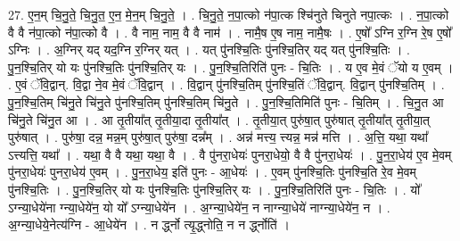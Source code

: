 \documentclass[17pt]{extarticle}
\begin{document}
27. ए॒न॒म् चि॒नु॒ते॒ चि॒नु॒त॒ ए॒न॒ मे॒न॒म् चि॒नु॒ते॒ । . चि॒नु॒ते॒ न॒पा॒त्को न॑पा॒त्क श्चि॑नुते चिनुते नपा॒त्कः । . न॒पा॒त्को वै वै न॑पा॒त्को न॑पा॒त्को वै । . वै नाम॒ नाम॒ वै वै नाम॑ । . नामै॒ष ए॒ष नाम॒ नामै॒षः । . ए॒षो᳚ ऽग्नि र॒ग्नि रे॒ष ए॒षो᳚ ऽग्निः । . अ॒ग्निर् यद् यद॒ग्नि र॒ग्निर् यत् । . यत् पु॑नश्चि॒तिः पु॑नश्चि॒तिर् यद् यत् पु॑नश्चि॒तिः । . पु॒न॒श्चि॒तिर् यो यः पु॑नश्चि॒तिः पु॑नश्चि॒तिर् यः । . पु॒न॒श्चि॒तिरिति॑ पुनः - चि॒तिः । . य ए॒व मे॒वं ॅयो य ए॒वम् । . ए॒वं ॅवि॒द्वान्. वि॒द्वा ने॒व मे॒वं ॅवि॒द्वान् । . वि॒द्वान् पु॑नश्चि॒तिम् पु॑नश्चि॒तिं ॅवि॒द्वान्. वि॒द्वान् पु॑नश्चि॒तिम् । . पु॒न॒श्चि॒तिम् चि॑नु॒ते चि॑नु॒ते पु॑नश्चि॒तिम् पु॑नश्चि॒तिम् चि॑नु॒ते । . पु॒न॒श्चि॒तिमिति॑ पुनः - चि॒तिम् । . चि॒नु॒त आ चि॑नु॒ते चि॑नु॒त आ । . आ तृ॒तीया᳚त् तृ॒तीया॒दा तृ॒तीया᳚त् । . तृ॒तीया॒त् पुरु॑षा॒त् पुरु॑षात् तृ॒तीया᳚त् तृ॒तीया॒त् पुरु॑षात् । . पुरु॑षा॒ दन्न॒ मन्न॒म् पुरु॑षा॒त् पुरु॑षा॒ दन्न᳚म् । . अन्न॑ मत्त्य॒ त्त्यन्न॒ मन्न॑ मत्ति । . अ॒त्ति॒ यथा॒ यथा᳚ ऽत्त्यत्ति॒ यथा᳚ । . यथा॒ वै वै यथा॒ यथा॒ वै । . वै पु॑नरा॒धेयः॑ पुनरा॒धेयो॒ वै वै पु॑नरा॒धेयः॑ । . पु॒न॒रा॒धेय॑ ए॒व मे॒वम् पु॑नरा॒धेयः॑ पुनरा॒धेय॑ ए॒वम् । . पु॒न॒रा॒धेय॒ इति॑ पुनः - आ॒धेयः॑ । . ए॒वम् पु॑नश्चि॒तिः पु॑नश्चि॒ति रे॒व मे॒वम् पु॑नश्चि॒तिः । . पु॒न॒श्चि॒तिर् यो यः पु॑नश्चि॒तिः पु॑नश्चि॒तिर् यः । . पु॒न॒श्चि॒तिरिति॑ पुनः - चि॒तिः । . यो᳚ ऽग्न्या॒धेये॑ना ग्न्या॒धेये॑न॒ यो यो᳚ ऽग्न्या॒धेये॑न । . अ॒ग्न्या॒धेये॑न॒ न नाग्न्या॒धेये॑ नाग्न्या॒धेये॑न॒ न । . अ॒ग्न्या॒धेये॒नेत्य॑ग्नि - आ॒धेये॑न । . न र्द्ध्नो त्यृ॒द्ध्नोति॒ न न र्द्ध्नोति॑ । \newline
\end{document}
